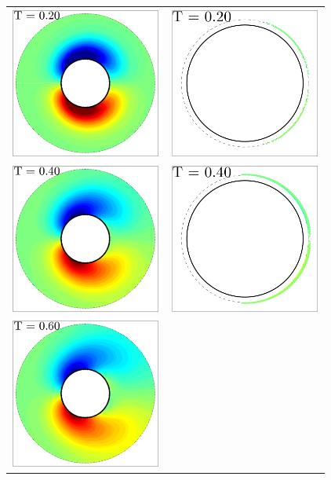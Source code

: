 \begin{figure}
 \begin{center}
 \begin{tabular}{cc}
 \includegraphics[width=5cm]{./Figures/results/static/vorticity_T0_20.pdf} &
 \includegraphics[width=5cm]{./Figures/results/static/vortices_T0_20.pdf}  \\
 \includegraphics[width=5cm]{./Figures/results/static/vorticity_T0_40.pdf} &
 \includegraphics[width=5cm]{./Figures/results/static/vortices_T0_40.pdf}  \\
 \includegraphics[width=5cm]{./Figures/results/static/vorticity_T0_60.pdf} &

\end{tabular}
\end{center}
\end{figure}
